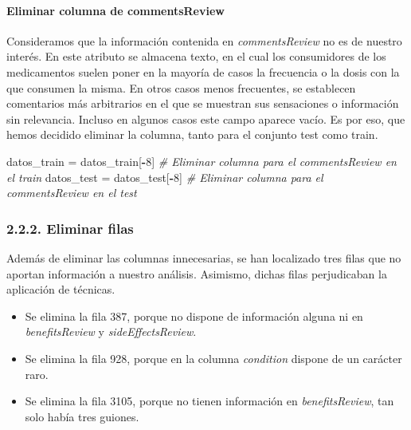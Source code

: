 \documentclass[spanish,]{article}
\newenvironment{Shaded}{\begin{snugshade}}{\end{snugshade}}
\newcommand{\DecValTok}[1]{\textcolor[rgb]{0.00,0.00,0.81}{#1}}
\newcommand{\StringTok}[1]{\textcolor[rgb]{0.31,0.60,0.02}{#1}}
\newcommand{\CommentTok}[1]{\textcolor[rgb]{0.56,0.35,0.01}{\textit{#1}}}
\newcommand{\OperatorTok}[1]{\textcolor[rgb]{0.81,0.36,0.00}{\textbf{#1}}}
\newcommand{\NormalTok}[1]{#1}
\providecommand{\tightlist}{%
  \setlength{\itemsep}{0pt}\setlength{\parskip}{0pt}}
\let\oldparagraph\paragraph
\renewcommand{\paragraph}[1]{\oldparagraph{#1}\mbox{}}
\begin{document}
\paragraph{Eliminar columna de
commentsReview}\label{eliminar-columna-de-commentsreview}

Consideramos que la información contenida en \emph{commentsReview} no es
de nuestro interés. En este atributo se almacena texto, en el cual los
consumidores de los medicamentos suelen poner en la mayoría de casos la
frecuencia o la dosis con la que consumen la misma. En otros casos menos
frecuentes, se establecen comentarios más arbitrarios en el que se
muestran sus sensaciones o información sin relevancia. Incluso en
algunos casos este campo aparece vacío. Es por eso, que hemos decidido
eliminar la columna, tanto para el conjunto test como train.

\begin{Shaded}
\begin{Highlighting}[]
\NormalTok{datos_train =}\StringTok{ }\NormalTok{datos_train[}\OperatorTok{-}\DecValTok{8}\NormalTok{] }\CommentTok{# Eliminar columna para el commentsReview en el train}
\NormalTok{datos_test =}\StringTok{ }\NormalTok{datos_test[}\OperatorTok{-}\DecValTok{8}\NormalTok{] }\CommentTok{# Eliminar columna para el commentsReview en el test}
\end{Highlighting}
\end{Shaded}

\subsubsection{2.2.2. Eliminar filas}\label{eliminar-filas}

Además de eliminar las columnas innecesarias, se han localizado tres
filas que no aportan información a nuestro análisis. Asimismo, dichas
filas perjudicaban la aplicación de técnicas.

\begin{itemize}
\tightlist
\item
  Se elimina la fila 387, porque no dispone de información alguna ni en
  \emph{benefitsReview} y \emph{sideEffectsReview}.
\item
  Se elimina la fila 928, porque en la columna \emph{condition} dispone
  de un carácter raro.
\item
  Se elimina la fila 3105, porque no tienen información en
  \emph{benefitsReview}, tan solo había tres guiones.
\end{itemize}
\end{document}
